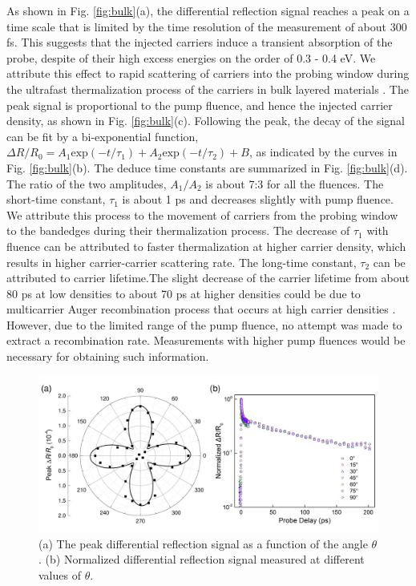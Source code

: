 \documentclass{osa-article}
\begin{document}
As shown in Fig. \ref{fig:bulk}(a), the differential reflection signal reaches a peak on a time scale that is limited by the time resolution of the measurement of about 300 fs. This suggests that the injected carriers induce a transient absorption of the probe, despite of their high excess energies on the order of 0.3 - 0.4 eV. We attribute this effect to rapid scattering of carriers into the probing window during the ultrafast thermalization process of the carriers in bulk layered materials \cite{jap113133702,nanoscale64915,nanoscale79526}. The peak signal is proportional to the pump fluence, and hence the injected carrier density, as shown in Fig. \ref{fig:bulk}(c). Following the peak, the decay of the signal can be fit by a bi-exponential function, $\Delta R / R_0 = A_1 \mathrm{exp}(-t/\tau_1) +A_2 \mathrm{exp}(-t/\tau_2) + B$, as indicated by the curves in Fig. \ref{fig:bulk}(b). The deduce time constants are summarized in Fig. \ref{fig:bulk}(d). The ratio of the two amplitudes, $A_1 / A_2$ is about 7:3 for all the fluences. The short-time constant, $\tau_1$ is about 1 ps and decreases slightly with pump fluence. We attribute this process to the movement of carriers from the probing window to the bandedges during their thermalization process. The decrease of $\tau_1$ with fluence can be attributed to faster thermalization at higher carrier density, which results in higher carrier-carrier scattering rate. The long-time constant, $\tau_2$ can be attributed to carrier lifetime.The slight decrease of the carrier lifetime from about 80 ps at low densities to about 70 ps at higher densities could be due to multicarrier Auger recombination process that occurs at high carrier densities \cite{b89125427}. However, due to the limited range of the pump fluence, no attempt was made to extract a recombination rate. Measurements with higher pump fluences would be necessary for obtaining such information.  




\begin{figure}
  \centering
  \includegraphics[width=12cm]{angle.pdf}
  \caption{(a) The peak differential reflection signal as a function of the angle $\theta$. (b) Normalized differential reflection signal measured at different values of $\theta$.}
    \label{fig:angle}
\end{figure}
\end{document}
